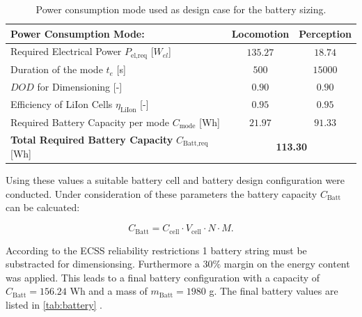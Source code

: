 \begin{table}[htb]
\centering
\caption{Power consumption mode used as design case for the battery sizing.}
\begin{tabular}{|l|c|c|}
\hline
\textbf{Power Consumption Mode:}                        & \textbf{Locomotion} & \textbf{Perception} \\ \hline
Required Electrical Power $P_\text{el,req}$ [$W_{el}$]         & $135.27$              & $18.74$               \\ \hline
Duration of the mode $t_e$ [s]                          & $500$              & $15000$            \\ \hline
$DOD$ for Dimensioning [-]                              & $0.90$                & $0.90$                \\ \hline
Efficiency of LiIon Cells $\eta_\text{LiIon}$ [-]       & $0.95$                & $0.95$                \\ \hline
Required Battery Capacity per mode $C_\text{mode}$ [Wh] & $21.97$              & $91.33$              \\ \hline
\textbf{Total Required Battery Capacity} $C_\text{Batt,req}$ [Wh]    & \multicolumn{2}{c|}{\textbf{113.30}}               \\ \hline
\end{tabular}


\label{tab:batsize}
\end{table}

Using these values a suitable battery cell and battery design configuration were conducted. Under consideration of these parameters the battery capacity $C_\text{Batt}$ can be calcuated:

\begin{equation}
C_\text{Batt} = C_\text{cell} \cdot V_\text{cell} \cdot N \cdot M .
\label{eq:batuse}
\end{equation}

According to the ECSS reliability restrictions 1 battery string must be substracted for dimensionsing. Furthermore a $30 \%$ margin on the energy content was applied. This leads to a final battery configuration with a capacity of $C_\text{Batt}=156.24$ Wh and a mass of $m_\text{Batt} = 1980$ g. The final battery values are listed in \autoref{tab:battery} \cite{SAFTBatteries.2018}.


